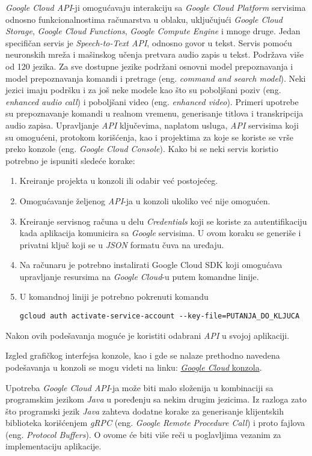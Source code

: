 \documentclass[android.tex]{subfiles}
\begin{document}
\textit{Google Cloud API}-ji omogućavaju interakciju sa \textit{Google Cloud Platform} servisima odnosno funkcionalnostima računarstva u oblaku, uključujući \textit{Google Cloud Storage}, \textit{Google Cloud Functions}, \textit{Google Compute Engine} i mnoge druge. Jedan specifičan servis je \textit{Speech-to-Text API}, odnosno govor u tekst. Servis pomoću neuronskih mreža i mašinskog učenja pretvara audio zapis u tekst. Podržava više od 120 jezika. Za sve dostupne jezike podržani osnovni model prepoznavanja i model prepoznavanja komandi i pretrage (eng. \textit{command and search model}). Neki jezici imaju podršku i za još neke modele kao što su poboljšani poziv (eng. \textit{enhanced audio call}) i poboljšani video (eng. \textit{enhanced video}). Primeri upotrebe su prepoznavanje komandi u realnom vremenu, generisanje titlova i transkripcija audio zapisa.   
Upravljanje \textit{API} ključevima, naplatom usluga, \textit{API} servisima koji su omogućeni, protokom korišćenja, kao i projektima za koje se koriste se vrše preko konzole (eng. \textit{Google Cloud Console}). Kako bi se neki servis koristio potrebno je ispuniti sledeće korake: 
\begin{enumerate}
    \item Kreiranje projekta u konzoli ili odabir već postojećeg.
    \item Omogućavanje željenog \textit{API}-ja u konzoli ukoliko već nije omogućen. 
    \item Kreiranje servisnog računa u delu \textit{Credentials} koji se koriste za autentifikaciju kada aplikacija komunicira sa \textit{Google} servisima. U ovom koraku se generiše i privatni ključ koji se u \textit{JSON} formatu čuva na uređaju.
    \item Na računaru je potrebno instalirati Google Cloud SDK koji omogućava upravljanje resursima na \textit{Google Cloud}-u putem komandne linije.
    \item U komandnoj liniji je potrebno pokrenuti komandu
    
    \verb|gcloud auth activate-service-account --key-file=PUTANJA_DO_KLJUCA|
\end{enumerate}
Nakon ovih podešavanja moguće je koristiti odabrani \textit{API} u svojoj aplikaciji.

Izgled grafičkog interfejsa  konzole, kao i gde se nalaze prethodno navedena podešavanja u konzoli se mogu videti na linku:
\hyperlink{https://cloud.google.com/speech-to-text/docs/ui-overview}{\textit{Google Cloud} konzola}.

Upotreba \textit{Google Cloud API}-ja može biti malo složenija u kombinaciji sa programskim jezikom \textit{Java} u poređenju sa nekim drugim jezicima. Iz razloga zato što programski jezik \textit{Java} zahteva dodatne korake za generisanje klijentskih biblioteka korišćenjem \textit{gRPC} (eng. \textit{Google Remote Procedure Call}) i proto fajlova (eng. \textit{Protocol Buffers}). O ovome će biti više reči u poglavljima vezanim za implementaciju aplikacije.
\end{document}
